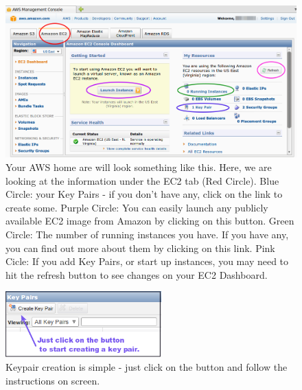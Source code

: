 \begin{figure}[!hd]
\includegraphics[width=\maxwidth]{"images/EC2Homepage2"}
\caption[EC2 Homepage]{\label{fig:ec2homepage}Your AWS home are will look something like this. Here, we are looking at the information under the EC2 tab (Red Circle). Blue Circle: your Key Pairs - if you don't have any, click on the link to create some. Purple Circle: You can easily launch any publicly available EC2 image from Amazon by clicking on this button. Green Circle: The number of running instances you have. If you have any, you can find out more about them by clicking on this link. Pink Cicle: If you add Key Pairs, or start up instances, you may need to hit the refresh button to see changes on your EC2 Dashboard.}
\end{figure}


\begin{figure}
\includegraphics[width=60mm]{"images/keypairCreateButton"}
\caption[Keypair creation]{\label{fig:keypaircreate}Keypair creation is simple - just click on the button and follow the instructions on screen.}
\end{figure}

